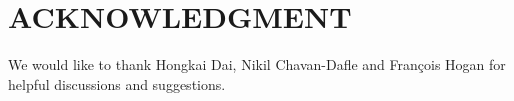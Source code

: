 
\section*{ACKNOWLEDGMENT}
We would like to thank Hongkai Dai, Nikil Chavan-Dafle and Fran{\c{c}}ois Hogan for helpful discussions and suggestions.